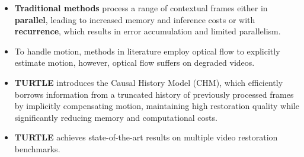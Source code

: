 \documentclass[landscape,paperwidth=48in,paperheight=36in,fontscale=0.3]{baposter}
\begin{document}
\begin{poster}
{\begin{minipage}[c]{\textwidth}
\begin{itemize}
            \item \textbf{Traditional methods} process a range of contextual frames either in \textbf{parallel}, leading to increased memory and inference costs or with \textbf{recurrence}, which results in error accumulation and limited parallelism.

            \item To handle motion, methods in literature employ optical flow to explicitly estimate motion, however, optical flow suffers on degraded videos.


            \item \textbf{\textsc{TURTLE}} introduces the Causal History Model (CHM), which efficiently \textcolor{imptext}{borrows information} from a truncated history of previously processed frames by implicitly compensating motion, maintaining high restoration quality while \textcolor{imptext}{significantly reducing memory and computational costs}.

            \item \textbf{\textsc{TURTLE}}  achieves state-of-the-art results on multiple video restoration benchmarks.
        \end{itemize} 
    \end{minipage}
}


\end{poster}
\end{document}
